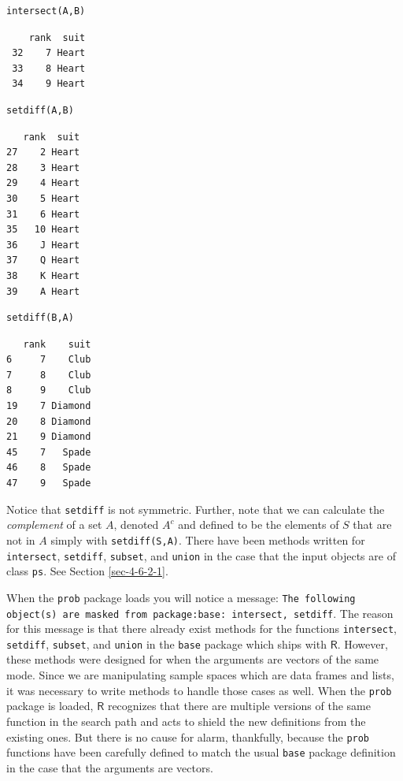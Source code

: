 \documentclass[captions=tableheading]{scrbook}
\begin{document}
\begin{verbatim}
intersect(A,B)
\end{verbatim}

\begin{verbatim}
    rank  suit
 32    7 Heart
 33    8 Heart
 34    9 Heart
\end{verbatim}


\begin{verbatim}
setdiff(A,B)
\end{verbatim}


\begin{verbatim}
   rank  suit
27    2 Heart
28    3 Heart
29    4 Heart
30    5 Heart
31    6 Heart
35   10 Heart
36    J Heart
37    Q Heart
38    K Heart
39    A Heart
\end{verbatim}


\begin{verbatim}
setdiff(B,A)
\end{verbatim}


\begin{verbatim}
   rank    suit
6     7    Club
7     8    Club
8     9    Club
19    7 Diamond
20    8 Diamond
21    9 Diamond
45    7   Spade
46    8   Spade
47    9   Spade
\end{verbatim}

Notice that \texttt{setdiff} is not symmetric. Further, note that we can calculate the \emph{complement} of a set \(A\), denoted \(A^{c}\) and defined to be the elements of \(S\) that are not in \(A\) simply with \texttt{setdiff(S,A)}. There have been methods written for \texttt{intersect}, \texttt{setdiff}, \texttt{subset}, and \texttt{union} in the case that the input objects are of class \texttt{ps}. See Section \ref{sec-4-6-2-1}.

\begin{note}

When the \texttt{prob} package loads you will notice a message: \texttt{The following object(s) are masked from package:base: intersect, setdiff}. The reason for this message is that there already exist methods for the functions \texttt{intersect}, \texttt{setdiff}, \texttt{subset}, and \texttt{union} in the \texttt{base} package which ships with \(\mathsf{R}\). However, these methods were designed for when the arguments are vectors of the same mode. Since we are manipulating sample spaces which are data frames and lists, it was necessary to write methods to handle those cases as well. When the \texttt{prob} package is loaded, \(\mathsf{R}\) recognizes that there are multiple versions of the same function in the search path and acts to shield the new definitions from the existing ones. But there is no cause for alarm, thankfully, because the \texttt{prob} functions have been carefully defined to match the usual \texttt{base} package definition in the case that the arguments are vectors. 

\end{note}
\end{document}
